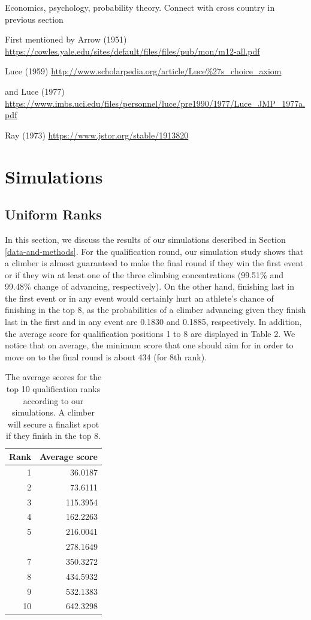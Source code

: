 \documentclass[12pt]{article}
\begin{document}
Economics, psychology, probability theory. Connect with cross country in
previous section

First mentioned by Arrow (1951)
\url{https://cowles.yale.edu/sites/default/files/files/pub/mon/m12-all.pdf}

Luce (1959)
\url{http://www.scholarpedia.org/article/Luce\%27s_choice_axiom}

and Luce (1977)
\url{https://www.imbs.uci.edu/files/personnel/luce/pre1990/1977/Luce_JMP_1977a.pdf}

Ray (1973) \url{https://www.jstor.org/stable/1913820}

\hypertarget{simulations}{%
\section{Simulations}\label{simulations}}

\hypertarget{uniform-ranks}{%
\subsection{Uniform Ranks}\label{uniform-ranks}}

In this section, we discuss the results of our simulations described in
Section \ref{data-and-methods}. For the qualification round, our
simulation study shows that a climber is almost guaranteed to make the
final round if they win the first event or if they win at least one of
the three climbing concentrations (99.51\% and 99.48\% change of
advancing, respectively). On the other hand, finishing last in the first
event or in any event would certainly hurt an athlete's chance of
finishing in the top 8, as the probabilities of a climber advancing
given they finish last in the first and in any event are 0.1830 and
0.1885, respectively. In addition, the average score for qualification
positions 1 to 8 are displayed in Table 2. We notice that on average,
the minimum score that one should aim for in order to move on to the
final round is about 434 (for 8th rank).

\begin{table}[H]

\caption{\label{tab:unnamed-chunk-6}The average scores for the top 10 qualification ranks according to our simulations. A climber will secure a finalist spot if they finish in the top 8.}
\centering
\begin{tabular}[t]{rr}
\toprule
Rank & Average score\\
\midrule
1 & 36.0187\\
2 & 73.6111\\
3 & 115.3954\\
4 & 162.2263\\
5 & 216.0041\\
\addlinespace
6 & 278.1649\\
7 & 350.3272\\
8 & 434.5932\\
9 & 532.1383\\
10 & 642.3298\\
\bottomrule
\end{tabular}
\end{table}
\end{document}
